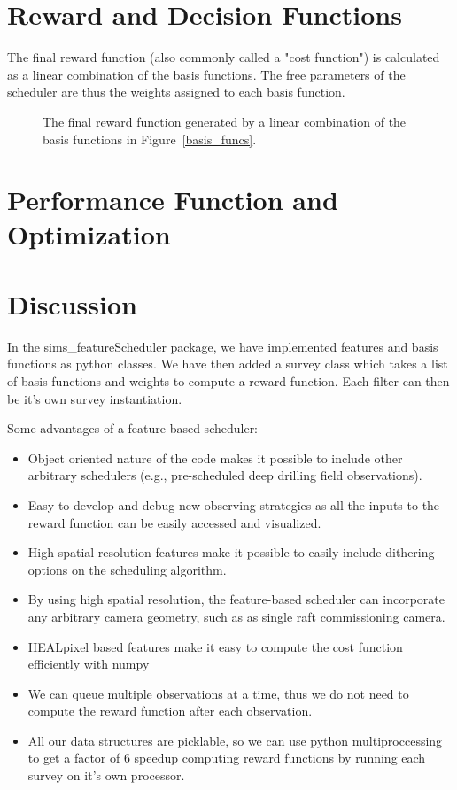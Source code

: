\documentclass[12pt,preprint]{aastex}
\begin{document}
\section{Reward and Decision Functions}

The final reward function (also commonly called a "cost function") is calculated as a linear combination of the basis functions. The free parameters of the scheduler are thus the weights assigned to each basis function. 

\begin{figure}
\caption{The final reward function generated by a linear combination of the basis functions in Figure~\ref{basis_funcs}.\label{goal}}
\end{figure}



\section{Performance Function and Optimization}

\section{Discussion}
In the sims\_featureScheduler package, we have implemented features and basis functions as python classes. We have then added a survey class which takes a list of basis functions and weights to compute a reward function. Each filter can then be it's own survey instantiation.

Some advantages of a feature-based scheduler:
\begin{itemize}
    \item{Object oriented nature of the code makes it possible to include other arbitrary schedulers (e.g., pre-scheduled deep drilling field observations).}
    \item{Easy to develop and debug new observing strategies as all the inputs to the reward function can be easily accessed and visualized.}
    \item{High spatial resolution features make it possible to easily include dithering options on the scheduling algorithm.}
    \item{By using high spatial resolution, the feature-based scheduler can incorporate any arbitrary camera geometry, such as as single raft commissioning camera.}
    \item{HEALpixel based features make it easy to compute the cost function efficiently with numpy}
    \item{We can queue multiple observations at a time, thus we do not need to compute the reward function after each  observation.}
    \item{All our data structures are picklable, so we can use python multiproccessing to get a factor of 6 speedup computing reward functions by running each survey on it's own processor.}
\end{itemize}




\end{document}
